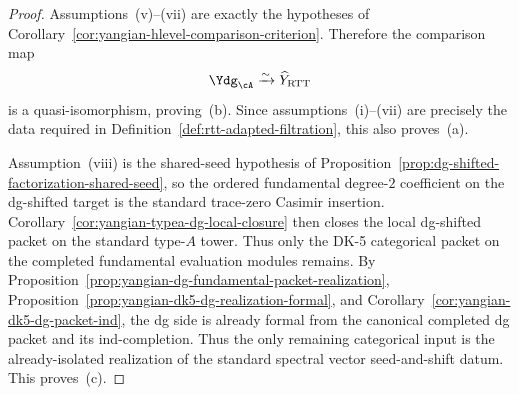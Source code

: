 \begin{proof}
Assumptions~\textup{(v)}--\textup{(vii)} are exactly the hypotheses of
Corollary~\ref{cor:yangian-hlevel-comparison-criterion}.  Therefore the
comparison map
\[
\Ydg_{\cA}\xrightarrow{\sim}\widehat Y_{\mathrm{RTT}}
\]
is a quasi-isomorphism, proving~\textup{(b)}.  Since
assumptions~\textup{(i)}--\textup{(vii)} are precisely the data
required in Definition~\ref{def:rtt-adapted-filtration}, this also
proves~\textup{(a)}.

Assumption~\textup{(viii)} is the shared-seed hypothesis of
Proposition~\ref{prop:dg-shifted-factorization-shared-seed}, so the
ordered fundamental degree-$2$ coefficient on the dg-shifted target is
the standard trace-zero Casimir insertion.  Corollary~\ref{cor:yangian-typea-dg-local-closure}
then closes the local dg-shifted packet on the standard type-$A$
tower.  Thus only the DK-5 categorical packet on the completed
fundamental evaluation modules remains.  By
Proposition~\ref{prop:yangian-dg-fundamental-packet-realization},
Proposition~\ref{prop:yangian-dk5-dg-realization-formal}, and
Corollary~\ref{cor:yangian-dk5-dg-packet-ind}, the dg side is already
formal from the canonical completed dg packet and its ind-completion.
Thus the only remaining categorical input is the already-isolated
realization of the standard spectral vector seed-and-shift datum.
This proves~\textup{(c)}.
\end{proof}


